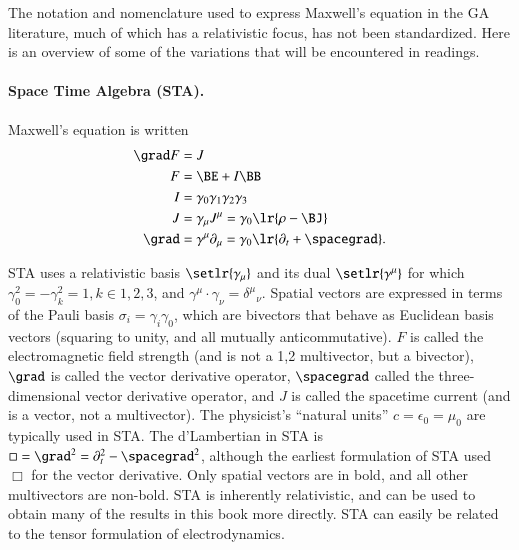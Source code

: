 %
%
The notation and nomenclature used to express Maxwell's equation in the GA literature, much of which has a relativistic focus, has not been standardized.
Here is an overview of some of the variations that will be encountered in readings.

\paragraph{Space Time Algebra (STA).  \citep{doran2003gap}}

Maxwell's equation is written
\begin{dmath}\label{eqn:galiterature:80}
\begin{aligned}
\grad F &= J \\
F &= \BE + I \BB \\
I &= \gamma_0 \gamma_1 \gamma_2 \gamma_3 \\
J &= \gamma_\mu J^\mu = \gamma_0 \lr{ \rho - \BJ } \\
\grad &= \gamma^\mu \partial_\mu = \gamma_0 \lr{ \partial_t + \spacegrad }.
\end{aligned}
\end{dmath}

STA uses a relativistic basis \( \setlr{ \gamma_\mu } \) and its dual \( \setlr{ \gamma^\mu} \) for which \( \gamma_0^2 = -\gamma_k^2 = 1, k \in 1,2,3 \), and \( \gamma^\mu \cdot \gamma_\nu = {\delta^\mu}_\nu \).
Spatial vectors are expressed in terms of the Pauli basis \( \sigma_i = \gamma_i \gamma_0 \), which are bivectors that behave as Euclidean basis vectors (squaring to unity, and all mutually anticommutative).
\( F \) is called the electromagnetic field strength (and is not a 1,2 multivector, but a bivector), \( \grad \) is called the vector derivative operator, \( \spacegrad \) called the three-dimensional vector derivative operator, and \( J \) is called the spacetime current (and is a vector, not a multivector).
The physicist's ``natural units'' \( c = \epsilon_0 = \mu_0 \) are typically used in STA.
The d'Lambertian in STA is \( \Box = \grad^2 = \partial_t^2 - \spacegrad^2 \), although the earliest
formulation of STA \citep{hestenes1966space} used \( \Box \) for the vector derivative.
Only spatial vectors are in bold, and all other multivectors are non-bold.
STA is inherently relativistic, and can be used to obtain many of the results in this book more directly.
STA can easily be related to the tensor formulation of electrodynamics.

